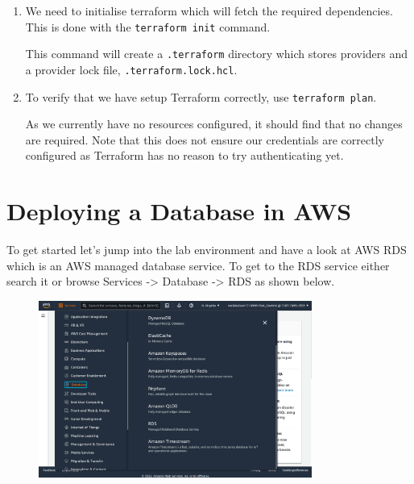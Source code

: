 \documentclass{csse4400}
\begin{document}
\begin{enumerate}
\item We need to initialise terraform which will fetch the required dependencies.
    This is done with the \texttt{terraform init} command.

This command will create a \texttt{.terraform} directory which stores providers and a provider lock file, \texttt{.terraform.lock.hcl}.

\item To verify that we have setup Terraform correctly, use \texttt{terraform plan}.

As we currently have no resources configured, it should find that no changes are required.
Note that this does not ensure our credentials are correctly configured as Terraform has no reason to try authenticating yet.

\end{enumerate}

\section{Deploying a Database in AWS}



To get started let's jump into the lab environment and have a look at AWS RDS which is an AWS managed database service. To get to the RDS service either search it or browse Services -> Database -> RDS as shown below.

\begin{figure}[H]
\includegraphics[width=0.8\textwidth]{images/aws_1}
\end{figure}
\end{document}
